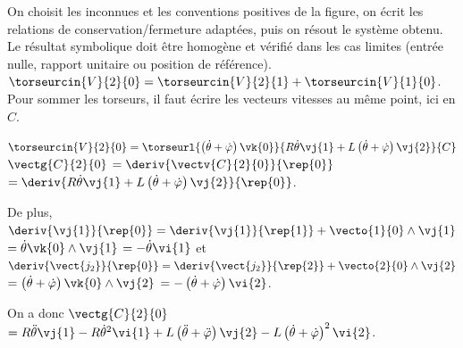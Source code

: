 \begin{corrigebox}
On choisit les inconnues et les conventions positives de la figure,
        on écrit les relations de conservation/fermeture adaptées, puis on résout le
        système obtenu. Le résultat symbolique doit être homogène et vérifié dans les cas
        limites (entrée nulle, rapport unitaire ou position de référence).
$\torseurcin{V}{2}{0}=\torseurcin{V}{2}{1}+\torseurcin{V}{1}{0}$. Pour sommer les torseurs, il faut écrire les vecteurs vitesses au même point, ici en $C$. 

$\torseurcin{V}{2}{0}=\torseurl{ \left( \dot{\theta}+\dot{\varphi}\right)\vk{0}}{R\dot{\theta}\vj{1}+L\left( \dot{\theta}+\dot{\varphi}\right)\vj{2}}{C}$
$\vectg{C}{2}{0}$ $ = \deriv{\vectv{C}{2}{0}}{\rep{0}}$ $= \deriv{R\dot{\theta}\vj{1}+L\left( \dot{\theta}+\dot{\varphi}\right)\vj{2}}{\rep{0}}$.

De plus,  $\deriv{\vj{1}}{\rep{0}} = \deriv{\vj{1}}{\rep{1}} + \vecto{1}{0}\wedge \vj{1}$
$ =\dot{\theta}\vk{0} \wedge \vj{1} $ $=-\dot{\theta}\vi{1}$ et 
$\deriv{\vect{j_2}}{\rep{0}} = \deriv{\vect{j_2}}{\rep{2}} + \vecto{2}{0}\wedge \vj{2}$
$ = \left( \dot{\theta}+\dot{\varphi}\right)\vk{0}\wedge \vj{2}$ $ = -\left( \dot{\theta}+\dot{\varphi}\right)\vi{2}$.

On a donc $\vectg{C}{2}{0}$ $=R\ddot{\theta}\vj{1}-R\dot{\theta}^2\vi{1}+L\left( \ddot{\theta}+\ddot{\varphi}\right)\vj{2}-L\left( \dot{\theta}+\dot{\varphi}\right)^2\vi{2}$.
\end{corrigebox}
